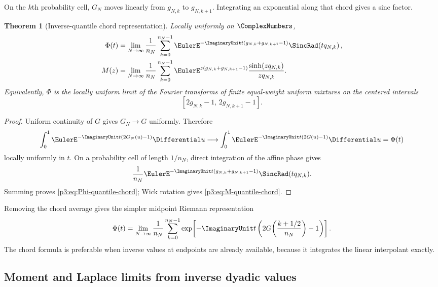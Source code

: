 \documentclass[11pt]{article}
\newtheorem{theorem}{Theorem}[section]
\theoremstyle{definition}
\theoremstyle{remark}
\begin{document}
On the $k$th probability cell, $G_N$ moves linearly from $g_{N,k}$ to
$g_{N,k+1}$.  Integrating an exponential along that chord gives a sinc factor.

\begin{theorem}[Inverse-quantile chord representation]
\label{p3:thm:quantile-chord}
Locally uniformly on $\ComplexNumbers$,
\begin{align}
 \Phi(t)
 &=\lim_{N\to\infty}\frac1{n_N}
 \sum_{k=0}^{n_N-1}
 \EulerE^{-\ImaginaryUnit t(g_{N,k}+g_{N,k+1}-1)}
 \SincRad\!\left(tq_{N,k}\right),
 \label{p3:eq:Phi-quantile-chord}\\
 M(z)
 &=\lim_{N\to\infty}\frac1{n_N}
 \sum_{k=0}^{n_N-1}
 \EulerE^{z(g_{N,k}+g_{N,k+1}-1)}
 \frac{\sinh(zq_{N,k})}{zq_{N,k}}.
 \label{p3:eq:M-quantile-chord}
\end{align}
Equivalently, $\Phi$ is the locally uniform limit of the Fourier transforms of
finite equal-weight uniform mixtures on the centered intervals
\begin{equation}\label{p3:eq:centered-quantile-intervals}
 [2g_{N,k}-1,\,2g_{N,k+1}-1].
\end{equation}
\end{theorem}

\begin{proof}
Uniform continuity of $G$ gives $G_N\to G$ uniformly.  Therefore
\[
 \int_0^1\EulerE^{-\ImaginaryUnit t(2G_N(u)-1)}\Differential u
 \longrightarrow
 \int_0^1\EulerE^{-\ImaginaryUnit t(2G(u)-1)}\Differential u=\Phi(t)
\]
locally uniformly in $t$.  On a probability cell of length $1/n_N$, direct
integration of the affine phase gives
\[
 \frac1{n_N}\EulerE^{-\ImaginaryUnit t(g_{N,k}+g_{N,k+1}-1)}
 \SincRad(tq_{N,k}).
\]
Summing proves \eqref{p3:eq:Phi-quantile-chord}; Wick rotation gives
\eqref{p3:eq:M-quantile-chord}.
\end{proof}

Removing the chord average gives the simpler midpoint Riemann representation
\begin{equation}\label{p3:eq:Phi-quantile-midpoint}
 \Phi(t)=\lim_{N\to\infty}\frac1{n_N}
 \sum_{k=0}^{n_N-1}
 \exp\!\left[-\ImaginaryUnit t\left(2G\!\left(\frac{k+1/2}{n_N}\right)-1\right)\right].
\end{equation}
The chord formula is preferable when inverse values at endpoints are already
available, because it integrates the linear interpolant exactly.

\subsection{Moment and Laplace limits from inverse dyadic values}
\end{document}
